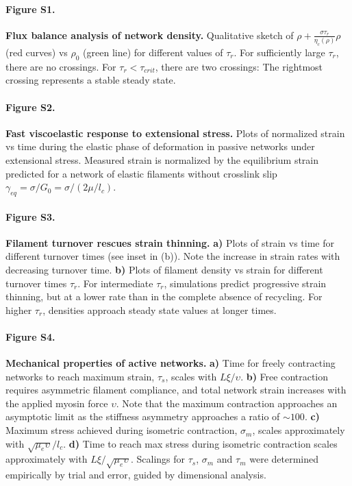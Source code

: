 \documentclass[10pt,letterpaper]{article}
\begin{document}
\paragraph*{Figure S1.}
\label{fig:flux_balance}
{\bf  Flux balance analysis of network density.}  Qualitative sketch of $\rho+\frac{\sigma \tau_r}{\eta_c(\rho)}\rho$ (red curves) vs $\rho_0$ (green line) for different values of $\tau_r$.  For sufficiently large $\tau_r$, there are no crossings.  For $\tau_r < \tau_{crit}$, there are two crossings:  The rightmost crossing represents a stable steady state.  
 

\paragraph*{Figure S2.}
\label{fig:passive_supp}
{\bf  Fast viscoelastic response to extensional stress.}  Plots of normalized strain vs time during the elastic phase of deformation in passive networks under extensional stress.  Measured strain is normalized by the equilibrium strain predicted for a network of elastic filaments without crosslink slip $\gamma_{eq} = \sigma/G_0 = \sigma/(2\mu/l_c)$.  


\paragraph*{Figure S3.}
\label{fig:thinning}
{\bf  Filament turnover rescues strain thinning.} \textbf{a)} Plots of strain vs time for different turnover times (see inset in (b)). Note the increase in strain rates with decreasing turnover time. \textbf{b)} Plots of filament density vs strain for different turnover times $\tau_r$.  For intermediate $\tau_r$, simulations predict progressive strain thinning, but at a lower rate than in the complete absence of recycling. For higher $\tau_r$, densities approach steady state values at longer times.  

\paragraph*{Figure S4.}
\label{fig:active_supp}
{\bf  Mechanical properties of active networks.}  \textbf{a)}  Time for freely contracting networks to reach maximum strain, $\tau_s$, scales with $L\xi/\upsilon$.  \textbf{b)} Free contraction requires asymmetric filament compliance, and total network strain increases with the applied myosin force $\upsilon$. Note that the maximum contraction approaches an asymptotic limit as the stiffness asymmetry approaches a ratio of $\sim 100$.   \textbf{c)}  Maximum stress achieved during isometric contraction, $\sigma_m$, scales approximately with $\sqrt{\mu_e\upsilon}/l_c$.  \textbf{d)} Time to reach max stress during isometric contraction scales approximately with $L\xi/\sqrt{\mu_e\upsilon}$. Scalings for $\tau_s$, $\sigma_m$ and $\tau_m$ were determined empirically by trial and error, guided by dimensional analysis.  
\end{document}
